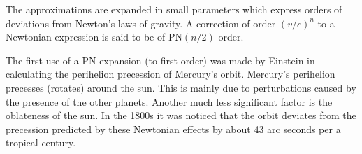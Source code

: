 \documentclass[english, oneside]{HYgradu}
\begin{document}
%
%




The approximations are expanded in small parameters which express orders of deviations from Newton's laws of gravity. A correction of order $(v/c)^n$ to a Newtonian expression is said to be of $\mathrm{PN}(n/2)$ order.

The first use of a PN expansion (to first order) was made by Einstein in calculating the perihelion precession of Mercury's orbit.
Mercury's perihelion precesses (rotates) around the sun. This is mainly due to perturbations caused by the presence of the other planets. Another much less significant factor is the oblateness of the sun. In the 1800s it was noticed that the orbit deviates from the precession predicted by these Newtonian effects by about 43 arc seconds per a tropical century.
\end{document}
